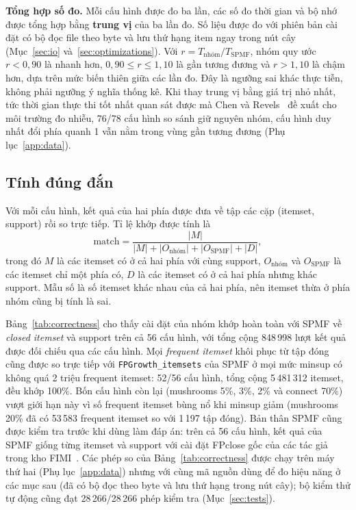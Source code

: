 \textbf{Tổng hợp số đo.} Mỗi cấu hình được đo ba lần, các số đo thời gian và bộ nhớ được tổng hợp bằng
\textbf{trung vị} của ba lần đo. Số liệu được đo với phiên bản cài đặt có bộ đọc file theo byte và lưu thứ hạng item
ngay trong nút cây (Mục~\ref{sec:io} và~\ref{sec:optimizations}). Với $r = T_{\text{nhóm}}/T_{\text{SPMF}}$, nhóm quy ước $r<0{,}90$ là nhanh hơn,
$0{,}90 \le r \le 1{,}10$ là gần tương đương và $r>1{,}10$ là chậm hơn, dựa trên mức biến thiên giữa các lần đo. Đây
là ngưỡng sai khác thực tiễn, không phải ngưỡng ý nghĩa thống kê. Khi thay trung vị bằng giá trị nhỏ nhất, tức thời
gian thực thi tốt nhất quan sát được mà Chen và Revels~\cite{chen2016} đề xuất cho môi trường đo nhiễu, 76/78 cấu
hình so sánh giữ nguyên nhóm, cấu hình duy nhất đổi phía quanh 1 vẫn nằm trong vùng gần tương đương
(Phụ lục~\ref{app:data}).

\subsection{Tính đúng đắn}
\label{sec:correctness}

Với mỗi cấu hình, kết quả của hai phía được đưa về tập các cặp (itemset, support) rồi so trực tiếp. Tỉ lệ khớp được
tính là
\begin{equation}
  \text{match} = \frac{|M|}{|M| + |O_{\text{nhóm}}| + |O_{\text{SPMF}}| + |D|},
\end{equation}
trong đó $M$ là các itemset có ở cả hai phía với cùng support, $O_{\text{nhóm}}$ và $O_{\text{SPMF}}$ là các itemset
chỉ một phía có, $D$ là các itemset có ở cả hai phía nhưng khác support. Mẫu số là số itemset khác nhau của cả hai
phía, nên itemset thừa ở phía nhóm cũng bị tính là sai.

Bảng~\ref{tab:correctness} cho thấy cài đặt của nhóm khớp hoàn toàn với SPMF về \textit{closed itemset} và support
trên cả 56 cấu hình, với tổng cộng 848\,998 lượt kết quả được đối chiếu qua các cấu hình. Mọi \textit{frequent
itemset} khôi phục từ tập đóng cũng được so trực tiếp với \texttt{FPGrowth\_itemsets} của SPMF ở mọi mức minsup có
không quá 2 triệu frequent itemset: 52/56 cấu hình, tổng cộng 5\,481\,312 itemset, đều khớp 100\%. Bốn cấu hình còn
lại (mushrooms 5\%, 3\%, 2\% và connect 70\%) vượt giới hạn này vì số frequent itemset bùng nổ khi minsup giảm
(mushrooms 20\% đã có 53\,583 frequent itemset so với 1\,197 tập đóng). Bản thân SPMF cũng được kiểm tra trước khi
dùng làm đáp án: trên cả 56 cấu hình, kết quả của SPMF giống từng itemset và support với cài đặt FPclose gốc của các
tác giả trong kho FIMI~\cite{grahne2003}. Các phép so của Bảng~\ref{tab:correctness} được chạy trên máy thứ hai
(Phụ lục~\ref{app:data}) nhưng với cùng mã nguồn  dùng để đo hiệu năng ở các mục sau (đã có bộ đọc theo
byte và lưu thứ hạng trong nút cây); bộ kiểm thử tự động cũng đạt 28\,266/28\,266 phép kiểm tra (Mục~\ref{sec:tests}).

